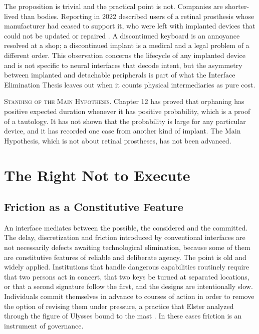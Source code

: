 \documentclass[11pt,twoside,openany]{book}
\theoremstyle{definition}
\theoremstyle{remark}
\newenvironment{standing}{\par\medskip\noindent\hrulefill\par\smallskip\noindent\textsc{Standing of the Main Hypothesis.}\enspace}{\par\smallskip\noindent\hrulefill\par\medskip}
\begin{document}
The proposition is trivial and the practical point is not. Companies are shorter-lived than bodies. Reporting in 2022 described users of a retinal prosthesis whose manufacturer had ceased to support it, who were left with implanted devices that could not be updated or repaired \cite{strickland2022}. A discontinued keyboard is an annoyance resolved at a shop; a discontinued implant is a medical and a legal problem of a different order. This observation concerns the lifecycle of any implanted device and is not specific to neural interfaces that decode intent, but the asymmetry between implanted and detachable peripherals is part of what the Interface Elimination Thesis leaves out when it counts physical intermediaries as pure cost.

\begin{standing}
Chapter 12 has proved that orphaning has positive expected duration whenever it has positive probability, which is a proof of a tautology. It has not shown that the probability is large for any particular device, and it has recorded one case from another kind of implant. The Main Hypothesis, which is not about retinal prostheses, has not been advanced.
\end{standing}

\chapter{The Right Not to Execute}

\section{Friction as a Constitutive Feature}

An interface mediates between the possible, the considered and the committed. The delay, discretization and friction introduced by conventional interfaces are not necessarily defects awaiting technological elimination, because some of them are constitutive features of reliable and deliberate agency. The point is old and widely applied. Institutions that handle dangerous capabilities routinely require that two persons act in concert, that two keys be turned at separated locations, or that a second signature follow the first, and the designs are intentionally slow. Individuals commit themselves in advance to courses of action in order to remove the option of revising them under pressure, a practice that Elster analyzed through the figure of Ulysses bound to the mast \cite{elster1979}. In these cases friction is an instrument of governance.
\end{document}
